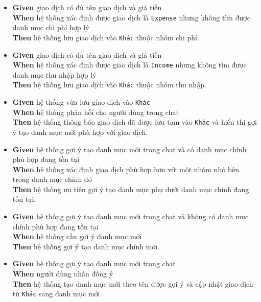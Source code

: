 \begin{itemize}
\item \textbf{Given} giao dịch có đủ tên giao dịch và giá tiền  \\ \hspace*{1.5em}  \textbf{When} hệ thống xác định được giao dịch là \texttt{Expense} nhưng không tìm được danh mục chi phí hợp lý  \\ \hspace*{1.5em}  \textbf{Then} hệ thống lưu giao dịch vào \texttt{Khác} thuộc nhóm chi phí.
\item \textbf{Given} giao dịch có đủ tên giao dịch và giá tiền  \\ \hspace*{1.5em}  \textbf{When} hệ thống xác định được giao dịch là \texttt{Income} nhưng không tìm được danh mục thu nhập hợp lý  \\ \hspace*{1.5em}  \textbf{Then} hệ thống lưu giao dịch vào \texttt{Khác} thuộc nhóm thu nhập.
\item \textbf{Given} hệ thống vừa lưu giao dịch vào \texttt{Khác}  \\ \hspace*{1.5em}  \textbf{When} hệ thống phản hồi cho người dùng trong chat  \\ \hspace*{1.5em}  \textbf{Then} hệ thống thông báo giao dịch đã được lưu tạm vào \texttt{Khác} và hiển thị gợi ý tạo danh mục mới phù hợp với giao dịch.
\item \textbf{Given} hệ thống gợi ý tạo danh mục mới trong chat và có danh mục chính phù hợp đang tồn tại  \\ \hspace*{1.5em}  \textbf{When} hệ thống xác định giao dịch phù hợp hơn với một nhóm nhỏ bên trong danh mục chính đó  \\ \hspace*{1.5em}  \textbf{Then} hệ thống ưu tiên gợi ý tạo danh mục phụ dưới danh mục chính đang tồn tại.
\item \textbf{Given} hệ thống gợi ý tạo danh mục mới trong chat và không có danh mục chính phù hợp đang tồn tại  \\ \hspace*{1.5em}  \textbf{When} hệ thống cần gợi ý danh mục mới  \\ \hspace*{1.5em}  \textbf{Then} hệ thống gợi ý tạo danh mục chính mới.
\item \textbf{Given} hệ thống gợi ý tạo danh mục mới trong chat  \\ \hspace*{1.5em}  \textbf{When} người dùng nhấn đồng ý  \\ \hspace*{1.5em}  \textbf{Then} hệ thống tạo danh mục mới theo tên được gợi ý và cập nhật giao dịch từ \texttt{Khác} sang danh mục mới.

\end{itemize}
